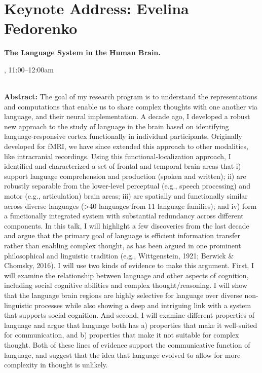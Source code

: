 \section{Keynote Address: Evelina Fedorenko}

\begin{center}
\begin{Large}
{\bfseries\Large The Language System in the Human Brain.}
\vspace{1em}\par
\end{Large}

\daydateyear, 11:00--12:00am \vspace{1em}\\
\PlenaryLoc \\
\vspace{1em}\par
\end{center}

\noindent
{\bfseries Abstract:} The goal of my research program is to understand the representations and computations that enable us to share complex thoughts with one another via language, and their neural implementation. A decade ago, I developed a robust new approach to the study of language in the brain based on identifying language-responsive cortex functionally in individual participants. Originally developed for fMRI, we have since extended this approach to other modalities, like intracranial recordings. Using this functional-localization approach, I identified and characterized a set of frontal and temporal brain areas that i) support language comprehension and production (spoken and written); ii) are robustly separable from the lower-level perceptual (e.g., speech processing) and motor (e.g., articulation) brain areas; iii) are spatially and functionally similar across diverse languages (>40 languages from 11 language families); and iv) form a functionally integrated system with substantial redundancy across different components. In this talk, I will highlight a few discoveries from the last decade and argue that the primary goal of language is efficient information transfer rather than enabling complex thought, as has been argued in one prominent philosophical and linguistic tradition (e.g., Wittgenstein, 1921; Berwick & Chomsky, 2016). I will use two kinds of evidence to make this argument. First, I will examine the relationship between language and other aspects of cognition, including social cognitive abilities and complex thought/reasoning. I will show that the language brain regions are highly selective for language over diverse non-linguistic processes while also showing a deep and intriguing link with a system that supports social cognition. And second, I will examine different properties of language and argue that language both has a) properties that make it well-suited for communication, and b) properties that make it not suitable for complex thought. Both of these lines of evidence support the communicative function of language, and suggest that the idea that language evolved to allow for more complexity in thought is unlikely.

